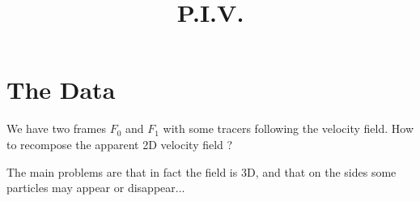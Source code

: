 \documentclass[aps,twocolumn]{revtex4}
\begin{document}
\title{P.I.V.}

\section{The Data}
We have two frames $F_0$ and $F_1$ with some tracers following the
velocity field. How to recompose the apparent 2D velocity field ?

The main problems are that in fact the field is 3D, and that
on the sides some particles may appear or disappear...
\end{document}
